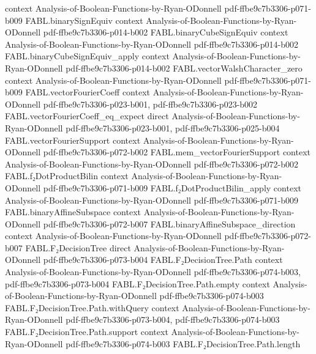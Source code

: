\begin{theorem}
  {context}
  {Analysis-of-Boolean-Functions-by-Ryan-ODonnell}
  {pdf-ffbe9c7b3306-p071-b009}
\proofstep
  {FABL.binarySignEquiv}
  {context}
  {Analysis-of-Boolean-Functions-by-Ryan-ODonnell}
  {pdf-ffbe9c7b3306-p014-b002}
\proofstep
  {FABL.binaryCubeSignEquiv}
  {context}
  {Analysis-of-Boolean-Functions-by-Ryan-ODonnell}
  {pdf-ffbe9c7b3306-p014-b002}
\proofstep
  {FABL.binaryCubeSignEquiv_apply}
  {context}
  {Analysis-of-Boolean-Functions-by-Ryan-ODonnell}
  {pdf-ffbe9c7b3306-p014-b002}
\proofstep
  {FABL.vectorWalshCharacter_zero}
  {context}
  {Analysis-of-Boolean-Functions-by-Ryan-ODonnell}
  {pdf-ffbe9c7b3306-p071-b009}
\proofstep
  {FABL.vectorFourierCoeff}
  {context}
  {Analysis-of-Boolean-Functions-by-Ryan-ODonnell}
  {pdf-ffbe9c7b3306-p023-b001,
    pdf-ffbe9c7b3306-p023-b002}
\proofstep
  {FABL.vectorFourierCoeff_eq_expect}
  {direct}
  {Analysis-of-Boolean-Functions-by-Ryan-ODonnell}
  {pdf-ffbe9c7b3306-p023-b001,
    pdf-ffbe9c7b3306-p025-b004}
\proofstep
  {FABL.vectorFourierSupport}
  {context}
  {Analysis-of-Boolean-Functions-by-Ryan-ODonnell}
  {pdf-ffbe9c7b3306-p072-b002}
\proofstep
  {FABL.mem_vectorFourierSupport}
  {context}
  {Analysis-of-Boolean-Functions-by-Ryan-ODonnell}
  {pdf-ffbe9c7b3306-p072-b002}
\proofstep
  {FABL.f₂DotProductBilin}
  {context}
  {Analysis-of-Boolean-Functions-by-Ryan-ODonnell}
  {pdf-ffbe9c7b3306-p071-b009}
\proofstep
  {FABL.f₂DotProductBilin_apply}
  {context}
  {Analysis-of-Boolean-Functions-by-Ryan-ODonnell}
  {pdf-ffbe9c7b3306-p071-b009}
\proofstep
  {FABL.binaryAffineSubspace}
  {context}
  {Analysis-of-Boolean-Functions-by-Ryan-ODonnell}
  {pdf-ffbe9c7b3306-p072-b007}
\proofstep
  {FABL.binaryAffineSubspace_direction}
  {context}
  {Analysis-of-Boolean-Functions-by-Ryan-ODonnell}
  {pdf-ffbe9c7b3306-p072-b007}
\proofstep
  {FABL.F₂DecisionTree}
  {direct}
  {Analysis-of-Boolean-Functions-by-Ryan-ODonnell}
  {pdf-ffbe9c7b3306-p073-b004}
\proofstep
  {FABL.F₂DecisionTree.Path}
  {context}
  {Analysis-of-Boolean-Functions-by-Ryan-ODonnell}
  {pdf-ffbe9c7b3306-p074-b003,
    pdf-ffbe9c7b3306-p073-b004}
\proofstep
  {FABL.F₂DecisionTree.Path.empty}
  {context}
  {Analysis-of-Boolean-Functions-by-Ryan-ODonnell}
  {pdf-ffbe9c7b3306-p074-b003}
\proofstep
  {FABL.F₂DecisionTree.Path.withQuery}
  {context}
  {Analysis-of-Boolean-Functions-by-Ryan-ODonnell}
  {pdf-ffbe9c7b3306-p073-b004,
    pdf-ffbe9c7b3306-p074-b003}
\proofstep
  {FABL.F₂DecisionTree.Path.support}
  {context}
  {Analysis-of-Boolean-Functions-by-Ryan-ODonnell}
  {pdf-ffbe9c7b3306-p074-b003}
\proofstep
  {FABL.F₂DecisionTree.Path.length}

\end{theorem}
